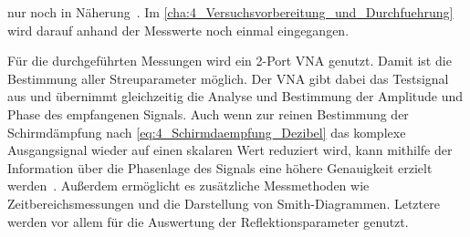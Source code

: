 nur noch in Näherung~\cite{EM_Schirmung}. Im \Abschnitt\ref{cha:4_Versuchsvorbereitung_und_Durchfuehrung} wird darauf anhand der Messwerte noch einmal eingegangen.
\par
\vspace{\linespace}







Für die durchgeführten Messungen wird ein 2-Port VNA genutzt. Damit ist die Bestimmung aller Streuparameter möglich. Der VNA gibt dabei das Testsignal aus und übernimmt gleichzeitig die Analyse und Bestimmung der Amplitude und Phase des empfangenen Signals. Auch wenn zur reinen Bestimmung der Schirmdämpfung nach \Gleichung\eqref{eq:4_Schirmdaempfung_Dezibel} das komplexe Ausgangsignal wieder auf einen skalaren Wert reduziert wird, kann mithilfe der Information über die Phasenlage des Signals eine höhere Genauigkeit erzielt werden~\cite{VNA-Handbuch}. Außerdem ermöglicht es zusätzliche Messmethoden wie Zeitbereichsmessungen und die Darstellung von Smith-Diagrammen. Letztere werden vor allem für die Auswertung der Reflektionsparameter genutzt.





